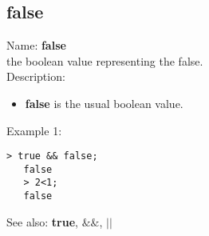 \subsection{ false }
\noindent Name: \textbf{false}\\
the boolean value representing the false.\\

\noindent Description: \begin{itemize}

\item \textbf{false} is the usual boolean value.
\end{itemize}
\noindent Example 1: 
\begin{center}\begin{minipage}{14.8cm}\begin{Verbatim}[frame=single]
   > true && false;
   false
   > 2<1;
   false
\end{Verbatim}
\end{minipage}\end{center}
See also: \textbf{true}, \textbf{$\&\&$}, \textbf{$||$}
